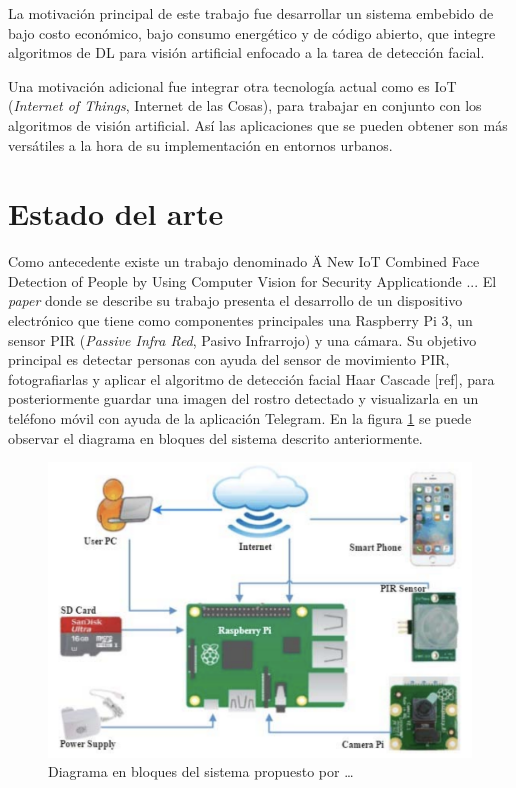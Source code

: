 La motivación principal de este trabajo fue desarrollar un sistema embebido de bajo costo económico, bajo consumo energético y de código abierto, que integre algoritmos de DL para visión artificial enfocado a la tarea de detección facial.

Una motivación adicional fue integrar otra tecnología actual como es IoT (\textit{Internet of Things}, Internet de las Cosas), para trabajar en conjunto con los algoritmos de visión artificial. Así las aplicaciones que se pueden obtener son más versátiles a la hora de su implementación en entornos urbanos.

\section{Estado del arte}
Como antecedente existe un trabajo denominado \"A New IoT Combined Face Detection of People by Using Computer Vision for Security Application\" de ... El \textit{paper} donde se describe su trabajo presenta el desarrollo de un dispositivo electrónico que tiene como componentes principales una Raspberry Pi 3, un sensor PIR (\textit{Passive Infra Red}, Pasivo Infrarrojo) y una cámara. Su objetivo principal es detectar personas con ayuda del sensor de movimiento PIR, fotografiarlas y aplicar el algoritmo de detección facial Haar Cascade [ref], para posteriormente guardar una imagen del rostro detectado y visualizarla en un teléfono móvil con ayuda de la aplicación Telegram. En la figura \ref{fig:soa_arch} se puede observar el diagrama en bloques del sistema descrito anteriormente.

\begin{figure}[h]
	\centering
	\includegraphics[scale=0.3]{./Figures/soa_arch.png}
	\caption{Diagrama en bloques del sistema propuesto por …}
	\label{fig:soa_arch}
\end{figure}

